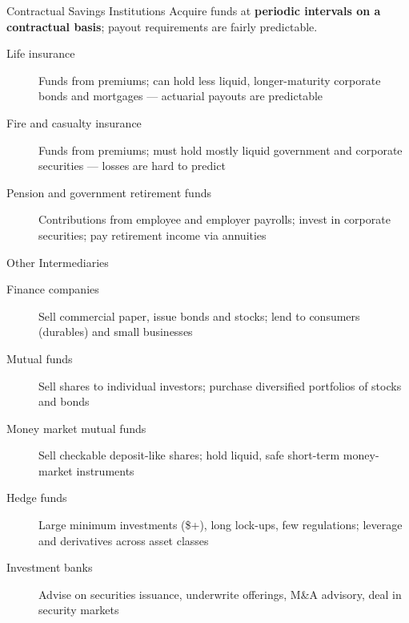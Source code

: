 \documentclass[aspectratio=169]{beamer}
\begin{document}
\begin{frame}{Contractual Savings Institutions}
Acquire funds at \textbf{periodic intervals on a contractual basis}; payout requirements are fairly predictable.
\begin{description}
  \item[Life insurance] Funds from premiums; can hold less liquid, longer-maturity corporate bonds and mortgages --- actuarial payouts are predictable
  \item[Fire and casualty insurance] Funds from premiums; must hold mostly liquid government and corporate securities --- losses are hard to predict
  \item[Pension and government retirement funds] Contributions from employee and employer payrolls; invest in corporate securities; pay retirement income via annuities
\end{description}
\end{frame}

\begin{frame}{Other Intermediaries}
\begin{description}
  \item[Finance companies] Sell commercial paper, issue bonds and stocks; lend to consumers (durables) and small businesses
  \item[Mutual funds] Sell shares to individual investors; purchase diversified portfolios of stocks and bonds
  \item[Money market mutual funds] Sell checkable deposit-like shares; hold liquid, safe short-term money-market instruments
  \item[Hedge funds] Large minimum investments (\$+), long lock-ups, few regulations; leverage and derivatives across asset classes
  \item[Investment banks] Advise on securities issuance, underwrite offerings, M\&A advisory, deal in security markets
\end{description}
\end{frame}

\end{document}
